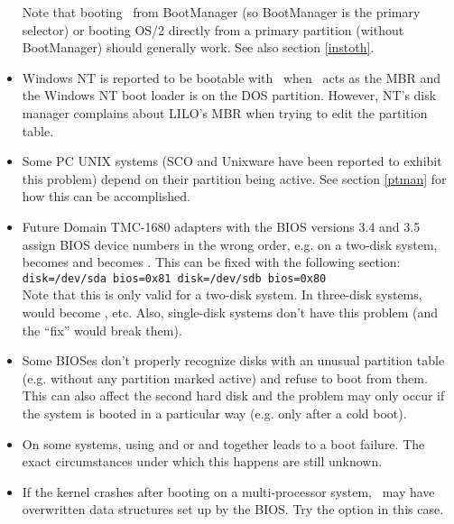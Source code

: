 \begin{itemize}
    Note that booting \LILO\ from BootManager (so BootManager is the
    primary selector) or booting OS/2 directly from a primary partition
    (without BootManager) should generally work. See also section
    \ref{instoth}.
  \item Windows NT is reported to be bootable with \LILO\ when \LILO\ acts as
    the MBR and the Windows NT boot loader is on the DOS partition. However,
    NT's disk manager complains about LILO's MBR when trying to edit the
    partition table.
  \item Some PC UNIX systems (SCO and Unixware have been reported to exhibit
    this problem) depend on their partition being active. See section
    \ref{ptman} for how this can be accomplished.
  \item Future Domain TMC-1680 adapters with the BIOS versions 3.4 and 3.5
    assign BIOS device numbers in the wrong order, e.g. on a two-disk system,
     becomes  and  becomes
    . This can be fixed with the following  section:\\
    \verb"disk=/dev/sda bios=0x81 disk=/dev/sdb bios=0x80"\\
    Note that this is only valid for a two-disk system. In three-disk
    systems,  would become , etc. Also, single-disk
    systems don't have this problem (and the ``fix'' would break them).
  \item Some BIOSes don't properly recognize disks with an unusual partition
    table (e.g. without any partition marked active) and refuse to boot from
    them. This can also affect the second hard disk and the problem may
    only occur if the system is booted in a particular way (e.g. only after a
    cold boot).
  \item On some systems, using  and  or 
     and  together
    leads to a boot failure. The exact circumstances under which this
    happens are still unknown.
  \item If the kernel crashes after booting on a multi-processor system,
    \LILO\ may have overwritten data structures set up by the BIOS. Try
    the option  in this case.
\end{itemize}


